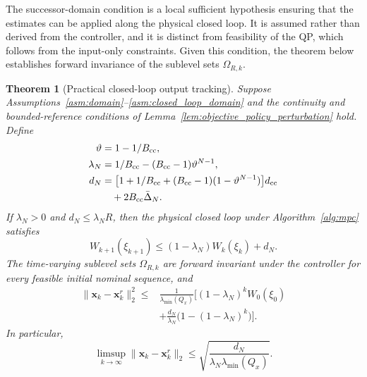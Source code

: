 \documentclass[journal]{IEEEtran}
\newcommand{\vx}{\mathbf{x}}
\newcommand{\norm}[2][]{\mathopen{#1\lVert}#2\mathclose{#1\rVert}}
\theoremstyle{plain}
\newtheorem{theorem}{Theorem}
\theoremstyle{definition}
\theoremstyle{definition}
\begin{document}
The successor-domain condition is a local sufficient hypothesis
ensuring that the estimates can be applied along the physical closed
loop. It is assumed rather than derived from the controller, and it is
distinct from feasibility of the QP, which follows from the input-only
constraints. Given this condition, the theorem below establishes
forward invariance of the sublevel sets $\Omega_{R,k}$.

\begin{theorem}[Practical closed-loop output tracking]
\label{thm:practical_stability}
Suppose Assumptions~\ref{asm:domain}--\ref{asm:closed_loop_domain}
and the continuity and bounded-reference conditions of
Lemma~\ref{lem:objective_policy_perturbation} hold. Define
\begin{equation}
\begin{aligned}
\vartheta&=1-1/B_{\rm cc},\\
\lambda_N&=1/B_{\rm cc}-(B_{\rm cc}-1)\vartheta^{N-1},\\
d_N&=\big[1+1/B_{\rm cc}
+(B_{\rm cc}-1)(1-\vartheta^{N-1})\big]d_{\rm cc}\\
&\quad+2B_{\rm cc}\bar\Delta_N.
\end{aligned}
\label{eq:robust_certificate_constants}
\end{equation}
If $\lambda_N>0$ and $d_N\le\lambda_NR$, then the physical closed
loop under Algorithm~\ref{alg:mpc} satisfies
\begin{equation}
W_{k+1}(\xi_{k+1})\le(1-\lambda_N)W_k(\xi_k)+d_N.
\label{eq:robust_lyapunov_decrease}
\end{equation}
The time-varying sublevel sets $\Omega_{R,k}$ are forward invariant
under the controller for every feasible initial nominal sequence, and
\begin{equation}
\begin{aligned}
\norm{\vx_k-\vx_k^r}_2^2
\le{}&\frac{1}{\lambda_{\min}(Q_x)}\Big[ (1-\lambda_N)^kW_0(\xi_0)\\
&+\frac{d_N}{\lambda_N}\big(1-(1-\lambda_N)^k\big)\Big].
\end{aligned}
\label{eq:finite_time_tracking_bound}
\end{equation}
In particular,
\begin{equation}
\limsup_{k\to\infty}\norm{\vx_k-\vx_k^r}_2
\le\sqrt{\frac{d_N}{\lambda_N\lambda_{\min}(Q_x)}}.
\label{eq:conditional_ultimate_bound}
\end{equation}
\end{theorem}
\end{document}
